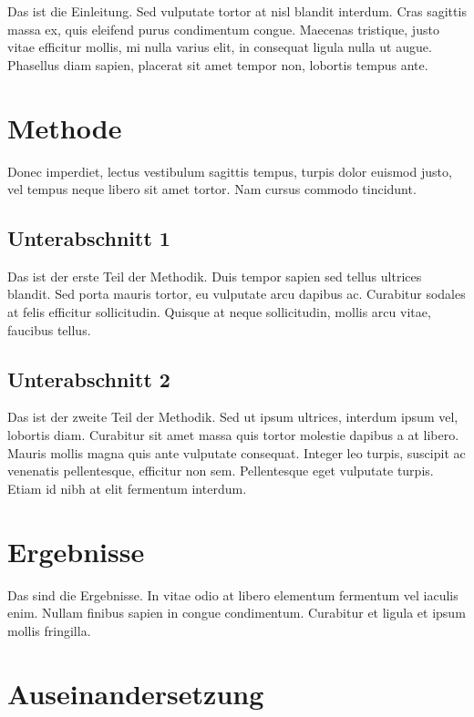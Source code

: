 \documentclass[listof=totoc,index=totoc,bibliography=totoc,12pt,german,a4paper,]{report}
\begin{document}
Das ist die Einleitung. Sed vulputate tortor at nisl blandit interdum.
Cras sagittis massa ex, quis eleifend purus condimentum congue. Maecenas
tristique, justo vitae efficitur mollis, mi nulla varius elit, in
consequat ligula nulla ut augue. Phasellus diam sapien, placerat sit
amet tempor non, lobortis tempus ante.

\section{Methode}\label{methode-1}

Donec imperdiet, lectus vestibulum sagittis tempus, turpis dolor euismod
justo, vel tempus neque libero sit amet tortor. Nam cursus commodo
tincidunt.

\subsection{Unterabschnitt 1}\label{unterabschnitt-1}

Das ist der erste Teil der Methodik. Duis tempor sapien sed tellus
ultrices blandit. Sed porta mauris tortor, eu vulputate arcu dapibus ac.
Curabitur sodales at felis efficitur sollicitudin. Quisque at neque
sollicitudin, mollis arcu vitae, faucibus tellus.

\subsection{Unterabschnitt 2}\label{unterabschnitt-2-1}

Das ist der zweite Teil der Methodik. Sed ut ipsum ultrices, interdum
ipsum vel, lobortis diam. Curabitur sit amet massa quis tortor molestie
dapibus a at libero. Mauris mollis magna quis ante vulputate consequat.
Integer leo turpis, suscipit ac venenatis pellentesque, efficitur non
sem. Pellentesque eget vulputate turpis. Etiam id nibh at elit fermentum
interdum.

\section{Ergebnisse}\label{ergebnisse-1}

Das sind die Ergebnisse. In vitae odio at libero elementum fermentum vel
iaculis enim. Nullam finibus sapien in congue condimentum. Curabitur et
ligula et ipsum mollis fringilla.

\section{Auseinandersetzung}\label{auseinandersetzung-1}
\end{document}
